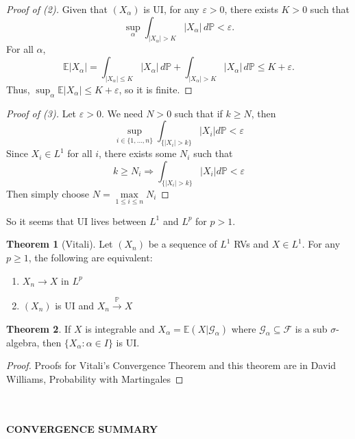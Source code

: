 \documentclass[11pt,a4paper]{article}
\theoremstyle{definition}
\newtheorem{theorem}{Theorem}[section]
\begin{document}
\begin{proof}[Proof of (2)]
Given that $(X_\alpha)$ is UI, for any $\varepsilon > 0$, there exists $K>0$ such that
\[
\sup_\alpha \int_{|X_\alpha| > K} |X_\alpha|\, d\mathbb{P} < \varepsilon.
\]
For all $\alpha$,
\[
\mathbb{E}|X_\alpha| = \int_{|X_\alpha| \leq K} |X_\alpha|\,d\mathbb{P}
+ \int_{|X_\alpha| > K} |X_\alpha|\,d\mathbb{P}
\leq K + \varepsilon.
\]
Thus, $\sup_\alpha \mathbb{E}|X_\alpha| \leq K + \varepsilon$, so it is finite.
\end{proof}

\begin{proof}[Proof of (3)]
Let $\varepsilon > 0$. We need $N > 0$ such that if $k \ge N$, then \[
\sup \limits _{i \in \{1,...,n\}} \int _{\{|X_i| > k\}} |X_i| d\mathbb{P} < \varepsilon
\]
Since $X_i \in L^1$ for all $i$, there exists some $N_i$ such that \[
k \ge N_i \Longrightarrow \int _{\{|X_i| > k\}} |X_i| d\mathbb{P} < \varepsilon
\]
Then simply choose $N = \max \limits _{1\le i\le n} N_i$
\end{proof}
\noindent So it seems that UI lives between $L^1$ and $L^p$ for $p > 1$.

\noindent
\begin{theorem} [Vitali] \label{thm:vitali} 
    Let $(X_n)$ be a sequence of $L^1$ RVs and $X \in L^1$. For any $p \ge 1$, the following are equivalent:

\begin{enumerate}
  \item $X_n \to X$ in $L^p$ 
  \item $(X_n)$ is UI and $X_n \xrightarrow{\mathbb{P}} X$
\end{enumerate}
\end{theorem}

\begin{theorem}
    If $X$ is integrable and $X_\alpha = \mathbb{E}(X|\mathcal{G}_\alpha)$ where $\mathcal{G}_\alpha \subseteq \mathcal{F}$ is a sub $\sigma$-algebra, then $\{X_\alpha : \alpha \in I\}$ is UI.
\end{theorem}
\begin{proof}
    Proofs for Vitali's Convergence Theorem and this theorem are in David Williams, Probability with Martingales
\end{proof}
\begin{center}

    ~\\~\\ \textbf{CONVERGENCE SUMMARY} \\

\end{center}
\end{document}
